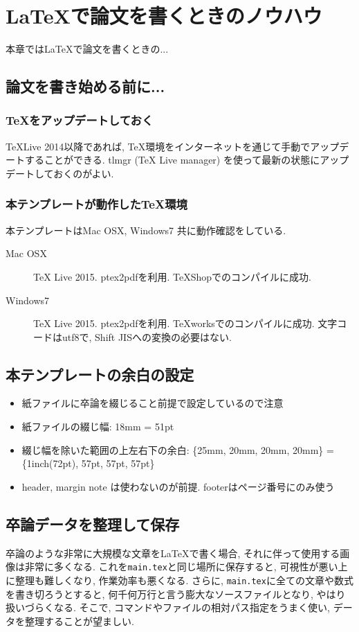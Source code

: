 \chapter{\LaTeX で論文を書くときのノウハウ}
本章では\LaTeX で論文を書くときの...

\addtocounter{section}{-1}
\section{論文を書き始める前に...}
\subsection{\TeX をアップデートしておく}
\TeX Live 2014以降であれば, \TeX 環境をインターネットを通じて手動でアップデートすることができる. tlmgr (TeX Live manager) を使って最新の状態にアップデートしておくのがよい.  
\subsection{本テンプレートが動作した\TeX 環境}
本テンプレートはMac OSX, Windows7 共に動作確認をしている. 
\begin{description}
\item[Mac OSX] TeX Live 2015. ptex2pdfを利用. TeXShopでのコンパイルに成功. 
\item[Windows7] TeX Live 2015. ptex2pdfを利用. TeXworksでのコンパイルに成功. 文字コードはutf8で, Shift JISへの変換の必要はない. 
\end{description}



\section{本テンプレートの余白の設定}
\begin{itemize}
\item 紙ファイルに卒論を綴じること前提で設定しているので注意
\item 紙ファイルの綴じ幅: 18mm = 51pt
\item 綴じ幅を除いた範囲の上左右下の余白: \{25mm, 20mm, 20mm, 20mm\} = \{1inch(72pt), 57pt, 57pt, 57pt\}
\item header, margin note は使わないのが前提. footerはページ番号にのみ使う
\end{itemize}

 
\section{卒論データを整理して保存}
卒論のような非常に大規模な文章を\LaTeX で書く場合, それに伴って使用する画像は非常に多くなる. これを\verb|main.tex|と同じ場所に保存すると, 可視性が悪い上に整理も難しくなり, 作業効率も悪くなる. さらに, \verb|main.tex|に全ての文章や数式を書き切ろうとすると, 何千何万行と言う膨大なソースファイルとなり, やはり扱いづらくなる. そこで, \verb||コマンドやファイルの相対パス指定をうまく使い, データを整理することが望ましい. 

